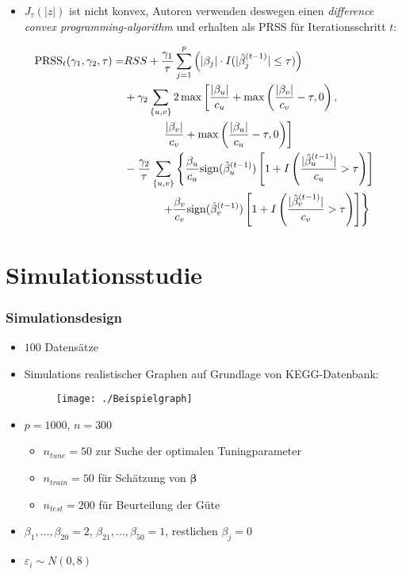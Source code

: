 \documentclass{beamer}
\begin{document}
\begin{frame}
	\begin{itemize}
	\item $J_\tau(|z|)$ ist nicht konvex, Autoren verwenden deswegen einen \textit{difference convex programming-algorithm} und erhalten als PRSS für Iterationsschritt $t$:
	\end{itemize}
	\begin{align*}
	\text{PRSS}_t(\gamma_1, \gamma_2, \tau) =& RSS+ \frac{\gamma_1}{\tau} \sum_{j=1}^{p}\left(|\beta_j|\cdot I(|\hat{\beta}_j^{(t-1)}| \leq \tau)\right) \notag \\
	&+ \gamma_2 \sum_{\{u,v\}} 2\max \left[\frac{|\beta_u|}{c_u}+\max\left(\frac{|\beta_v|}{c_v}-\tau, 0\right), \right. \\
	&\phantom{{}=1111} \left.\frac{|\beta_v|}{c_v}+\max\left(\frac{|\beta_u|}{c_u}-\tau, 0\right)\right] \notag \\
	&- \frac{\gamma_2}{\tau} \sum_{\{u,v\}} \left\lbrace
	\frac{\beta_u}{c_u}\text{sign}(\hat{\beta}_u^{(t-1)}) \left[1+I\left(\frac{|\hat{\beta}_u^{(t-1)}|}{c_u}>\tau \right) \right] \right. \notag \\
	&\phantom{{}=1111} \left. + 
	\frac{\beta_v}{c_v}\text{sign}(\hat{\beta}_v^{(t-1)})\left[1+I\left(\frac{|\hat{\beta}_v^{(t-1)}|}{c_v}>\tau \right) \right]
	\right\rbrace
	\end{align*}
\end{frame}


\section{Simulationsstudie}
\begin{frame}
	\frametitle{Simulationsdesign}
	\begin{itemize}
	\item $100$ Datensätze
	\item Simulations realistischer Graphen auf Grundlage von KEGG-Datenbank:
	\begin{figure}
	\centering
	\texttt{[image: ./Beispielgraph]}
	\label{fig:beispiel}
	\end{figure}
	\item $p=1000$, $n=300$ 
	\begin{itemize}
	\item $n_{tune}=50$ zur Suche der optimalen Tuningparameter
	\item $n_{train}=50$ für Schätzung von $\boldsymbol{\beta}$
	\item $n_{test}=200$ für Beurteilung der Güte
	\end{itemize}
	\item $\beta_1,\dots,\beta_{20}=2$, $\beta_{21},\dots,\beta_{50}=1$, restlichen $\beta_j=0$
	\item $\varepsilon_i \sim N(0,8)$  
	\end{itemize}
\end{frame}
\end{document}
